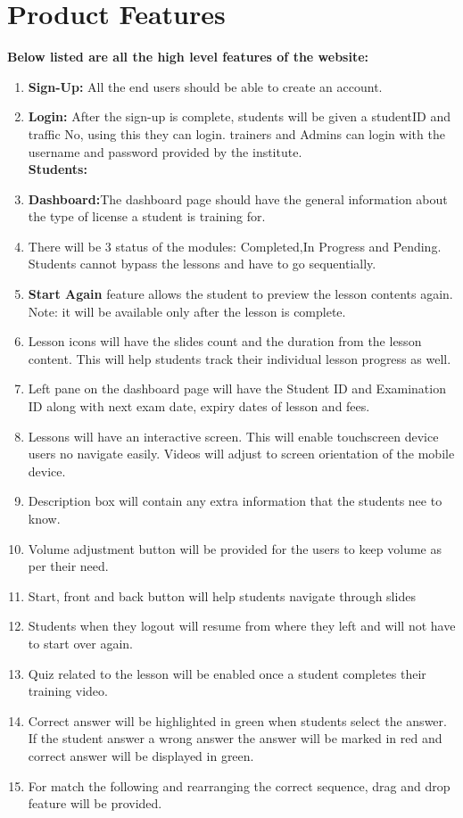 \documentclass{report}
\begin{document}
\section{Product Features}
\textbf{Below listed are all the high level features of the website:}
\begin{enumerate}
    \item \textbf{Sign-Up:} All the end users should be able to create an account.
    \item \textbf{Login:} After the sign-up is complete, students will be given a studentID and traffic No, using this they can login. trainers and Admins can login with the username and password provided by the institute.\\[0.5ex]
    
    \clearpage
    \textbf{Students:}
    \item \textbf{Dashboard:}The dashboard page should have the general information about the type of license a student is training for.
    \item There will be 3 status of the modules: Completed,In Progress and Pending. Students cannot bypass the lessons and have to go sequentially.
    \item \textbf{Start Again} feature allows the student to preview the lesson contents again. Note: it will be available only after the lesson is complete.
    \item Lesson icons will have the slides count and the duration from the lesson content. This will help students track their individual lesson progress as well.
    \item Left pane on the dashboard page will have the Student ID and Examination ID along with next exam date, expiry dates of lesson and fees.
    \item Lessons will have an interactive screen. This will enable touchscreen device users no navigate easily. Videos will adjust to screen orientation of the mobile device.
    \item Description box will contain any extra information that the students nee to know.
    \item Volume adjustment button will be provided for the users to keep volume as per their need.
    \item Start, front and back button will help students navigate through slides
    \item Students when they logout will resume from where they left and will not have to start over again.
    \item Quiz related to the lesson will be enabled once a student completes their training video.
    \item Correct answer will be highlighted in green when students select the answer. If the student answer a wrong answer the answer will be marked in red and correct answer will be displayed in green.
    \item For match the following and rearranging the correct sequence, drag and drop feature will be provided.\\[0.5ex]
    

\end{enumerate}
\end{document}
